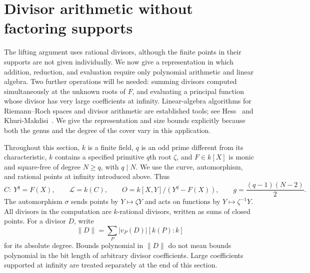 \section{Divisor arithmetic without factoring supports}
\label{sec:divisors}

The lifting argument uses rational divisors, although the finite points in
their supports are not given individually.  We now give a representation in
which addition, reduction, and evaluation require only polynomial arithmetic
and linear algebra.  Two further operations will be needed: summing divisors
computed simultaneously at the unknown roots of $F$, and evaluating a
principal function whose divisor has very large coefficients at infinity.
Linear-algebra algorithms for Riemann--Roch spaces and divisor arithmetic
are established tools; see Hess~\cite{Hess02} and
Khuri-Makdisi~\cite{KhuriMakdisi04}.  We give the representation and size
bounds explicitly because both the genus and the degree of the cover vary
in this application.

Throughout this section, $k$ is a finite field, $q$ is an odd prime different
from its characteristic, $k$ contains a specified primitive $q$th root
$\zeta$, and $F\in k[X]$ is monic and square-free of degree $N\geq q$, with
$q\mid N$.  We use the curve, automorphism, and rational points at infinity
introduced above.  Thus
\[
 C:\ Y^q=F(X),\qquad
 \mathcal L=k(C),\qquad
 O=k[X,Y]/(Y^q-F(X)),\qquad
 g=\frac{(q-1)(N-2)}2.
\]
The automorphism $\sigma$ sends points by $Y\mapsto\zeta Y$ and acts on
functions by $Y\mapsto\zeta^{-1}Y$.  All divisors in the computation are
$k$-rational divisors, written as sums of closed points.  For a divisor $D$,
write
\[
 \|D\|=\sum_P |v_P(D)|[k(P):k]
\]
for its absolute degree.  Bounds polynomial in $\|D\|$ do not mean bounds
polynomial in the bit length of arbitrary divisor coefficients.  Large
coefficients supported at infinity are treated separately at the end of
this section.

